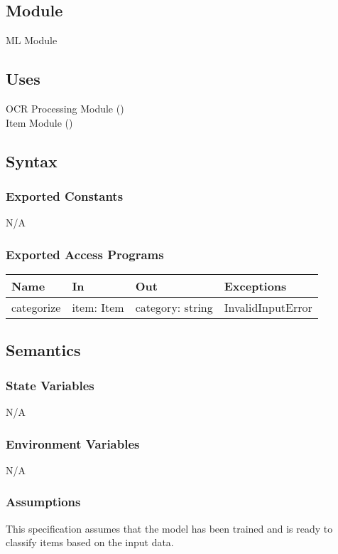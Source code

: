 \documentclass[12pt, titlepage]{article}
\begin{document}
\subsection{Module}
ML Module

\subsection{Uses}
OCR Processing Module ()\\
Item Module ()

\subsection{Syntax}

\subsubsection{Exported Constants}
N/A

\subsubsection{Exported Access Programs}

\begin{center}
\begin{tabular}{p{4cm} p{4cm} p{4cm} p{4cm}}
\hline
\textbf{Name} & \textbf{In} & \textbf{Out} & \textbf{Exceptions} \\
\hline
categorize & item: Item & category: string & InvalidInputError \\
\hline
\end{tabular}
\end{center}

\subsection{Semantics}

\subsubsection{State Variables}
N/A

\subsubsection{Environment Variables}
N/A

\subsubsection{Assumptions}
This specification assumes that the model has been trained and is ready to
classify items based on the input data.
\end{document}
